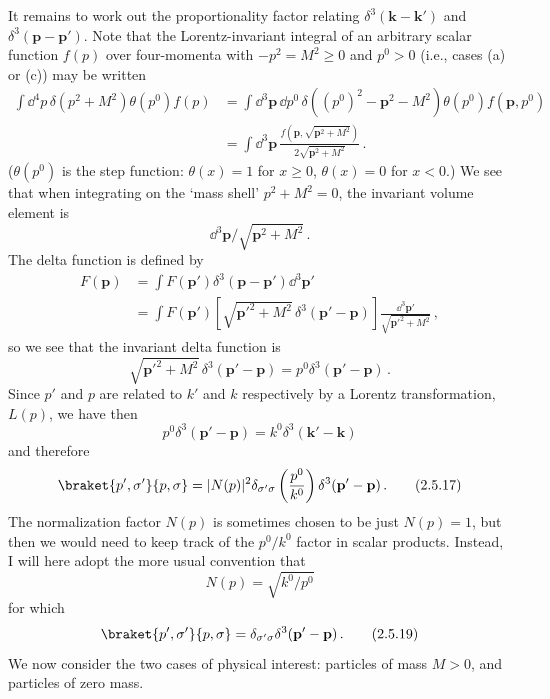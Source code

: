 It remains to work out the proportionality factor relating
$\delta^3(\mathbf{k}-\mathbf{k}')$ and
$\delta^3(\mathbf{p}-\mathbf{p}')$. Note that the Lorentz-invariant integral
of an arbitrary scalar function $f(p)$ over four-momenta with
$-p^2=M^2\geq0$ and $p^0>0$ (i.e., cases (a) or (c)) may be written
\[
\begin{aligned}
\int \dd^4p\,\delta(p^2+M^2)\theta(p^0)f(p)
&=\int \dd^3\mathbf{p}\,\dd p^0\,
\delta((p^0)^2-\mathbf{p}^2-M^2)\theta(p^0)f(\mathbf{p},p^0)\\
&=\int \dd^3\mathbf{p}\,
\frac{f(\mathbf{p},\sqrt{\mathbf{p}^2+M^2})}
{2\sqrt{\mathbf{p}^2+M^2}}\,.
\end{aligned}
\]
($\theta(p^0)$ is the step function: $\theta(x)=1$ for $x\geq0$,
$\theta(x)=0$ for $x<0$.) We see that when integrating on the `mass shell'
$p^2+M^2=0$, the invariant volume element is
\begin{equation}
\dd^3\mathbf{p}/\sqrt{\mathbf{p}^2+M^2}\,.
\tag{2.5.15}\label{eq:2.5.15}
\end{equation}
The delta function is defined by
\[
\begin{aligned}
F(\mathbf{p})
&=\int F(\mathbf{p}')\delta^3(\mathbf{p}-\mathbf{p}')\dd^3\mathbf{p}'\\
&=\int F(\mathbf{p}')
\left[\sqrt{\mathbf{p}'^2+M^2}\,
\delta^3(\mathbf{p}'-\mathbf{p})\right]
\frac{\dd^3\mathbf{p}'}{\sqrt{\mathbf{p}'^2+M^2}}\,,
\end{aligned}
\]
so we see that the invariant delta function is
\begin{equation}
\sqrt{\mathbf{p}'^2+M^2}\,\delta^3(\mathbf{p}'-\mathbf{p})
=p^0\delta^3(\mathbf{p}'-\mathbf{p})\,.
\tag{2.5.16}\label{eq:2.5.16}
\end{equation}
Since $p'$ and $p$ are related to $k'$ and $k$ respectively by a Lorentz
transformation, $L(p)$, we have then
\[
p^0\delta^3(\mathbf{p}'-\mathbf{p})
=k^0\delta^3(\mathbf{k}'-\mathbf{k})
\]
and therefore
\begin{equation}
\braket{p',\sigma'}{p,\sigma}
=|N(p)|^2\delta_{\sigma'\sigma}
\left(\frac{p^0}{k^0}\right)
\delta^3(\mathbf{p}'-\mathbf{p})\,.
\tag{2.5.17}\label{eq:2.5.17}
\end{equation}
The normalization factor $N(p)$ is sometimes chosen to be just $N(p)=1$, but
then we would need to keep track of the $p^0/k^0$ factor in scalar products.
Instead, I will here adopt the more usual convention that
\begin{equation}
N(p)=\sqrt{k^0/p^0}
\tag{2.5.18}\label{eq:2.5.18}
\end{equation}
for which
\begin{equation}
\braket{p',\sigma'}{p,\sigma}
=\delta_{\sigma'\sigma}\delta^3(\mathbf{p}'-\mathbf{p})\,.
\tag{2.5.19}\label{eq:2.5.19}
\end{equation}
We now consider the two cases of physical interest: particles of mass $M>0$,
and particles of zero mass.

